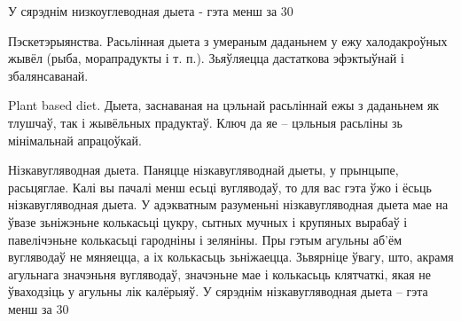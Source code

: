 У сярэднім низкоуглеводная дыета - гэта менш за 30%

Пэскетэрыянства.
Расьлінная дыета з умераным даданьнем у ежу халодакроўных жывёл (рыба, морапрадукты і т. п.). Зьяўляецца дастаткова эфэктыўнай і збалянсаванай.

Plant based diet.
Дыета, заснаваная на цэльнай расьліннай ежы з даданьнем як тлушчаў, так і жывёльных прадуктаў. Ключ да яе – цэльныя расьліны зь мінімальнай апрацоўкай.

Нізкавугляводная дыета.
Паняцце нізкавугляводнай дыеты, у прынцыпе, расьцяглае. Калі вы пачалі менш есьці вугляводаў, то для вас гэта ўжо і ёсьць нізкавугляводная дыета. У адэкватным разуменьні нізкавугляводная дыета мае на ўвазе зьніжэньне колькасьці цукру, сытных мучных і крупяных вырабаў і павелічэньне колькасьці гародніны і зеляніны. Пры гэтым агульны аб'ём вугляводаў не мяняецца, а іх колькасьць зьніжаецца. Зьвярніце ўвагу, што, акрамя агульнага значэньня вугляводаў, значэньне мае і колькасьць клятчаткі, якая не ўваходзіць у агульны лік калёрыяў.
У сярэднім нізкавугляводная дыета – гэта менш за 30%
